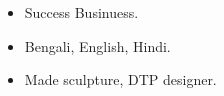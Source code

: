 








\begin{itemize}
    \item Success Businuess.
\end{itemize}


\begin{itemize}
    \item Bengali, English, Hindi.
\end{itemize}
\vspace{10px}

\begin{itemize}
    \item Made sculpture, DTP designer.
\end{itemize}






